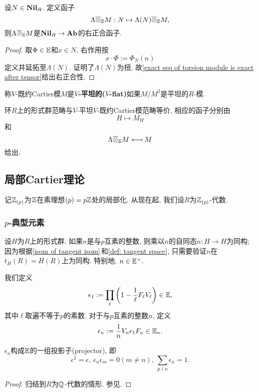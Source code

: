 \begin{defprop}\label{def: functor - nil tensor V-reduced module}
    设$N\in\mathbf{Nil}_R$.
    定义函子\[\Lambda\overline{\otimes}_{\mathbb{E}} M : N\mapsto \Lambda(N) \overline{\otimes}_{\mathbb{E}} M,\]则$\Lambda\overline{\otimes}_{\mathbb{E}} M$是$\mathbf{Nil}_R\to\mathbf{Ab}$的右正合函子.
\end{defprop}
\begin{proof}
    取$\Phi\in\mathbb{E}$和$x\in N$, 右作用按\[x\cdot\Phi := \Phi_N(n)\]定义并延拓至$\Lambda(N)$. \cite[Theorem 3.22]{Zi84}证明了$\Lambda(N)$为扭, 故\cref{exact seq of torsion module is exact after tensor}给出右正合性.
\end{proof}


\begin{definition}
    称$V$-既约Cartier模$M$是\textbf{$V$-平坦的($V$-flat)}如果$M/M^2$是平坦的$R$-模.
\end{definition}

\begin{theorem}[Cartier第二主定理]\label{formal group equiv V-flat V-reduced Cartier module}
    环$R$上的形式群范畴与$V$-平坦$V$-既约Cartier模范畴等价, 相应的函子分别由\[H\longmapsto M_H\]
    和\[\Lambda\overline{\otimes}_{\mathbb{E}} M\longmapsfrom M\]给出.
\end{theorem}

\subsection{局部Cartier理论}
记$\mathbb{Z}_{(p)}$为$\mathbb{Z}$在素理想$(p) = p\mathbb{Z}$处的局部化.
从现在起, 我们设$R$为$\mathbb{Z}_{(p)}$-代数.

\subsubsection{$p$-典型元素}

设$H$为$R$上的形式群. 如果$n$是与$p$互素的整数,
则乘以$n$的自同态$n : H\to H$为同构; 因为根据\cref{isom of tangent isom}\,和\cref{def: tangent space},
只需要验证$n$在$t_H(R) = H(R)$上为同构. 特别地, $n\in\mathbb{E}^\times$.

我们定义\[\epsilon_1 := \prod_{\ell}\left( 1-\frac{1}{\ell}F_\ell V_\ell \right)\in\mathbb{E},\]
其中$\ell$取遍不等于$p$的素数. 对于与$p$互素的整数$n$, 定义\[\epsilon_n := \frac{1}{n}V_n\epsilon_1 F_n\in\mathbb{E}_n.\]
\begin{lemma}
    $\epsilon_n$构成$\mathbb{E}$的一组投影子(projector), 即\[\epsilon^2 = \epsilon,\ \epsilon_n\epsilon_m=0(m\ne n),\ \sum_{p \nmid n}\epsilon_n = 1.\]
\end{lemma}
\begin{proof}
    归结到$R$为$\mathbb{Q}$-代数的情形. 参见\cite[Lemma 4.11]{Zi84}.
\end{proof}


